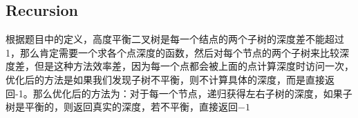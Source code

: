  \subsection{Recursion}
根据题目中的定义，高度平衡二叉树是每一个结点的两个子树的深度差不能超过1，那么肯定需要一个求各个点深度的函数，然后对每个节点的两个子树来比较深度差，但是这种方法效率差，因为每一个点都会被上面的点计算深度时访问一次，优化后的方法是如果我们发现子树不平衡，则不计算具体的深度，而是直接返回-1。那么优化后的方法为：对于每一个节点，递归获得左右子树的深度，如果子树是平衡的，则返回真实的深度，若不平衡，直接返回$-1$
